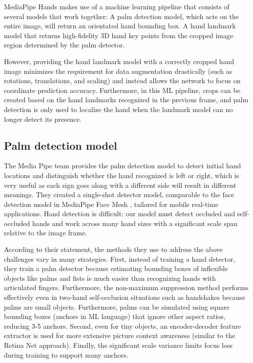 MediaPipe Hands makes use of a machine learning pipeline that consists of several models that work together: A palm detection model, which acts on the entire image, will return an orientated hand bounding box. A hand landmark model that returns high-fidelity 3D hand key points from the cropped image region determined by the palm detector.

However, providing the hand landmark model with a correctly cropped hand image minimizes the requirement for data augmentation drastically (such as rotations, translations, and scaling) and instead allows the network to focus on coordinate prediction accuracy. Furthermore, in this ML pipeline, crops can be created based on the hand landmarks recognized in the previous frame, and palm detection is only used to localize the hand when the landmark model can no longer detect its presence.
\subsection{Palm detection model}
The Media Pipe team provides the palm detection model to detect initial hand locations and distinguish whether the hand recognized is left or right, which is very useful as each sign goes along with a different side will result in different meanings. They created a single-shot detector model, comparable to the face detection model in MediaPipe Face Mesh \cite{MediaPipeFaceMesh}, tailored for mobile real-time applications. Hand detection is difficult: our model must detect occluded and self-occluded hands and work across many hand sizes with a significant scale span relative to the image frame.

According to their statement, the methods they use to address the above challenges vary in many strategies. First, instead of training a hand detector, they train a palm detector because estimating bounding boxes of inflexible objects like palms and fists is much easier than recognizing hands with articulated fingers. Furthermore, the non-maximum suppression method performs effectively even in two-hand self-occlusion situations such as handshakes because palms are small objects. Furthermore, palms can be simulated using square bounding boxes (anchors in ML language) that ignore other aspect ratios, reducing 3-5 anchors. Second, even for tiny objects, an encoder-decoder feature extractor is used for more extensive picture context awareness (similar to the Retina Net approach). Finally, the significant scale variance limits focus loss during training to support many anchors.

